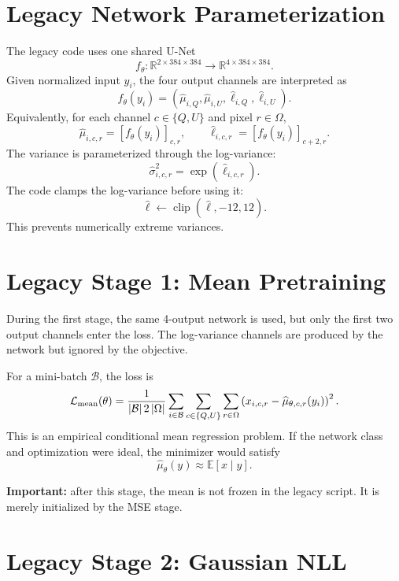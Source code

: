 \documentclass[11pt]{article}
\newcommand{\net}{f_\theta}
\newcommand{\mean}{\mu}
\newcommand{\logvar}{\ell}
\newcommand{\std}{\sigma}
\newcommand{\pix}{r}
\newcommand{\chan}{c}
\newcommand{\grid}{\Omega}
\newcommand{\batch}{\mathcal{B}}
\newcommand{\E}{\mathbb{E}}
\newcommand{\R}{\mathbb{R}}
\begin{document}
\section{Legacy Network Parameterization}

The legacy code uses one shared U-Net
\[
  \net:\R^{2\times 384\times 384}
  \longrightarrow
  \R^{4\times 384\times 384}.
\]
Given normalized input \(y_i\), the four output channels are interpreted as
\[
  \net(y_i)
  =
  \left(
    \widehat{\mean}_{i,Q},
    \widehat{\mean}_{i,U},
    \widehat{\logvar}_{i,Q},
    \widehat{\logvar}_{i,U}
  \right).
\]
Equivalently, for each channel \(\chan\in\{Q,U\}\) and pixel
\(\pix\in\grid\),
\[
  \widehat{\mean}_{i,\chan,\pix}
  =
  [\net(y_i)]_{\chan,\pix},
  \qquad
  \widehat{\logvar}_{i,\chan,\pix}
  =
  [\net(y_i)]_{\chan+2,\pix}.
\]
The variance is parameterized through the log-variance:
\[
  \widehat{\std}_{i,\chan,\pix}^2
  =
  \exp\!\left(\widehat{\logvar}_{i,\chan,\pix}\right).
\]
The code clamps the log-variance before using it:
\[
  \widehat{\logvar}
  \leftarrow
  \operatorname{clip}(\widehat{\logvar},-12,12).
\]
This prevents numerically extreme variances.

\section{Legacy Stage 1: Mean Pretraining}

During the first stage, the same 4-output network is used, but only the first
two output channels enter the loss.  The log-variance channels are produced by
the network but ignored by the objective.

For a mini-batch \(\batch\), the loss is
\[
  \mathcal{L}_{\rm mean}(\theta)
  =
  \frac{1}{|\batch|\,2\,|\grid|}
  \sum_{i\in\batch}
  \sum_{\chan\in\{Q,U\}}
  \sum_{\pix\in\grid}
  \left(
    x_{i,\chan,\pix}
    -
    \widehat{\mean}_{\theta,\chan,\pix}(y_i)
  \right)^2 .
\]
This is an empirical conditional mean regression problem.  If the network class
and optimization were ideal, the minimizer would satisfy
\[
  \widehat{\mean}_{\theta}(y)
  \approx
  \E[x\mid y].
\]

\textbf{Important:} after this stage, the mean is not frozen in the legacy
script.  It is merely initialized by the MSE stage.

\section{Legacy Stage 2: Gaussian NLL}
\end{document}
